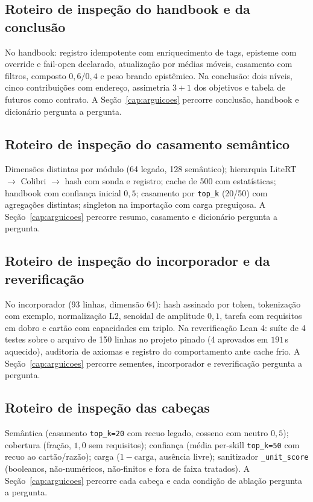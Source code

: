 \subsection{Roteiro de inspeção do handbook e da conclusão}
No handbook: registro idempotente com enriquecimento de tags, episteme com override e fail-open declarado, atualização por médias móveis, casamento com filtros, composto $0{,}6/0{,}4$ e peso brando epistêmico. Na conclusão: dois níveis, cinco contribuições com endereço, assimetria $3+1$ dos objetivos e tabela de futuros como contrato. A Seção~\ref{cap:arguicoes} percorre conclusão, handbook e dicionário pergunta a pergunta.
\subsection{Roteiro de inspeção do casamento semântico}
Dimensões distintas por módulo (64 legado, 128 semântico); hierarquia LiteRT $\to$ Colibri $\to$ hash com sonda e registro; cache de 500 com estatísticas; handbook com confiança inicial $0{,}5$; casamento por \texttt{top\_k} (20/50) com agregações distintas; singleton na importação com carga preguiçosa. A Seção~\ref{cap:arguicoes} percorre resumo, casamento e dicionário pergunta a pergunta.
\subsection{Roteiro de inspeção do incorporador e da reverificação}
No incorporador (93 linhas, dimensão 64): hash assinado por token, tokenização com exemplo, normalização L2, senoidal de amplitude $0{,}1$, tarefa com requisitos em dobro e cartão com capacidades em triplo. Na reverificação Lean 4: suíte de 4 testes sobre o arquivo de 150 linhas no projeto pinado (4 aprovados em $191$\,s aquecido), auditoria de axiomas e registro do comportamento ante cache frio. A Seção~\ref{cap:arguicoes} percorre sementes, incorporador e reverificação pergunta a pergunta.
\subsection{Roteiro de inspeção das cabeças}
Semântica (casamento \texttt{top\_k=20} com recuo legado, cosseno com neutro $0{,}5$); cobertura (fração, $1{,}0$ sem requisitos); confiança (média per-skill \texttt{top\_k=50} com recuo ao cartão/razão); carga ($1-\mathrm{carga}$, ausência livre); sanitizador \texttt{\_unit\_score} (booleanos, não-numéricos, não-finitos e fora de faixa tratados). A Seção~\ref{cap:arguicoes} percorre cada cabeça e cada condição de ablação pergunta a pergunta.

